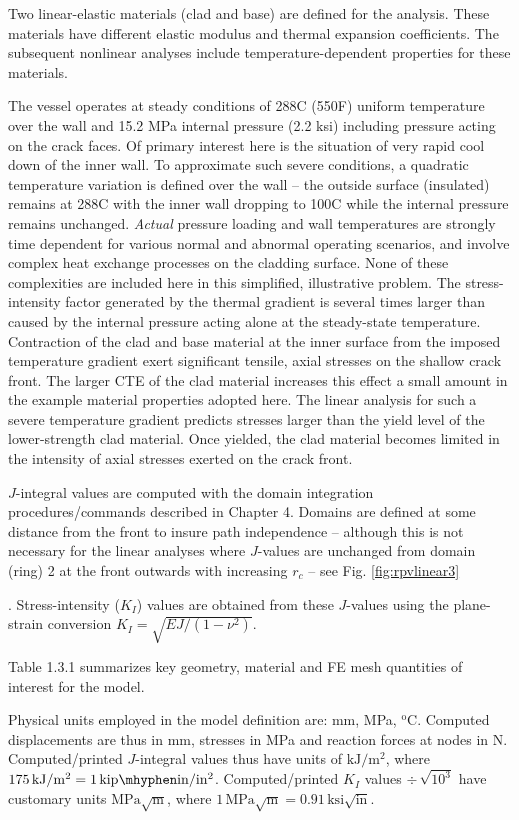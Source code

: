 \documentclass[11pt]{report}
\numberwithin{equation}{section}
\newcommand{\degree } {\mathrm{o} }  %
\newcommand{\ti}{\emph}
\begin{document}
{Two linear-elastic materials (clad and base) are defined for the analysis. These 
materials have different elastic modulus and thermal expansion coefficients. The subsequent
nonlinear analyses include temperature-dependent properties for these materials.

The vessel operates at steady conditions of 288C (550F)
uniform temperature over the wall and 15.2 MPa internal pressure (2.2 ksi) including pressure acting on
the crack faces. Of primary interest here 
is the situation of very rapid cool down of the inner wall. To approximate
such severe conditions, a quadratic temperature variation is defined over the wall --
the outside surface (insulated) remains at 288C with the inner wall dropping to 100C while the internal
pressure remains unchanged. \ti{Actual} pressure loading and wall 
temperatures are strongly time dependent for various normal and abnormal
operating scenarios, 
and involve complex heat exchange processes on the cladding surface. None of these
complexities are included here in this simplified, illustrative problem. The 
stress-intensity factor generated by the
thermal gradient is several times larger than caused by the
internal pressure acting alone at the steady-state temperature. 
Contraction of the clad and base material at the inner surface from the
imposed temperature gradient exert significant tensile, axial stresses on the
shallow crack front. The larger CTE of the clad material increases this effect
a small amount in the example material properties adopted here.
The linear analysis  for such a severe temperature gradient predicts stresses
larger than the yield level of the lower-strength clad material. Once yielded, the
clad material becomes limited in the intensity of axial
stresses exerted on the crack front. 

$J$-integral values are computed with the domain integration 
procedures/commands described in Chapter 4. Domains are defined at some 
distance from the front to insure path independence -- although this is not
necessary for the linear analyses where $J$-values are unchanged from domain (ring) 2 
at the front outwards with increasing $r_c$ -- see Fig. \ref{fig:rpvlinear3}}.
Stress-intensity ($K_I$) values are obtained
from these $J$-values using the plane-strain conversion $K_I=\sqrt{E J/(1-\nu^2)}$.


Table 1.3.1 summarizes key geometry, material and FE mesh quantities of interest for the model.


Physical units employed in the model definition are: mm, MPa, $^\degree \mathrm{C}$. Computed 
displacements are thus in mm, stresses in MPa and reaction forces at nodes in N. Computed/printed
$J$-integral values thus have units of  $\mathrm{kJ/m^2}$, where
$\mathrm{175\, kJ/m^2=1\, kip\mhyphen in/in^2}$. Computed/printed $K_I$ values $\div\,\sqrt{10^3}$
have customary units $\mathrm{MPa\sqrt{m}}$, where $1\, \mathrm{MPa\sqrt{m}}= 
\mathrm{0.91\, ksi\sqrt{in}}$.
\end{document}
